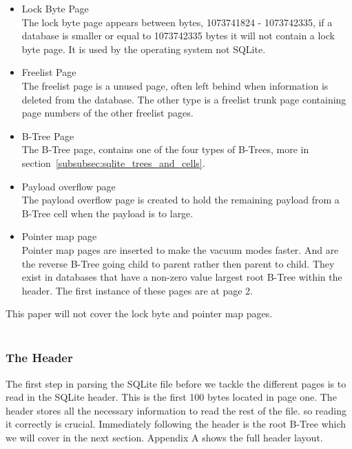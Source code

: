 \begin{itemize} 
	\item Lock Byte Page \hfill \\
		The lock byte page appears between bytes, 1073741824 - 1073742335, if a database is smaller or equal to 1073742335 bytes it will not contain a lock byte page. It is used by the operating system not SQLite.
	
	\item Freelist Page \hfill \\
		The freelist page is a unused page, often left behind when information is deleted from the database. The other type is a freelist trunk page containing page numbers of the other freelist pages.
	
	\item B-Tree Page \hfill \\
		The B-Tree page, contains one of the four types of B-Trees, more in section~\ref{subsubsec:sqlite_trees_and_cells}.
	
	\item Payload overflow page \hfill \\
		The payload overflow page is created to hold the remaining payload from a B-Tree cell when the payload is to large.
	
	\item Pointer map page \hfill \\
		Pointer map pages are inserted to make the vacuum modes faster. And are the reverse B-Tree going child to parent rather then parent to child. They exist in databases that have a non-zero value largest root B-Tree within the header. The first instance of these pages are at page 2. 
\end{itemize} 

This paper will not cover the lock byte and pointer map pages. 
\\\\
\subsubsection{The Header}
\label{subsubsec:sqlite_page_hader}

The first step in parsing the SQLite file before we tackle the different pages is to read in the SQLite header. This is the first 100 bytes located in page one. The header stores all the necessary information to read the rest of the file. so reading it correctly is crucial. Immediately following the header is the root B-Tree which we will cover in the next section. Appendix A shows the full header layout.
\\
